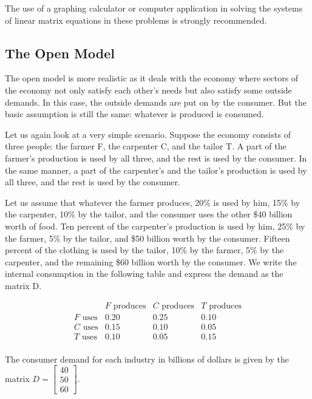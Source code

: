 \begin{note}
    The use of a graphing calculator or computer application in solving the systems of linear matrix equations in these problems is strongly recommended.
\end{note}

\subsection{The Open Model}
The open model is more realistic as it deals with the economy where sectors of the economy not only satisfy each other’s needs but also satisfy some outside demands. In this case, the outside demands are put on by the consumer. But the basic assumption is still the same: whatever is produced is consumed.

Let us again look at a very simple scenario. Suppose the economy consists of three people: the farmer F, the carpenter C, and the tailor T. A part of the farmer's production is used by all three, and the rest is used by the consumer. In the same manner, a part of the carpenter's and the tailor's production is used by all three, and the rest is used by the consumer.

Let us assume that whatever the farmer produces, 20\% is used by him, 15\% by the carpenter, 10\% by the tailor, and the consumer uses the other \$40 billion worth of food. Ten percent of the carpenter's production is used by him, 25\% by the farmer, 5\% by the tailor, and \$50 billion worth by the consumer. Fifteen percent of the clothing is used by the tailor, 10\% by the farmer, 5\% by the carpenter, and the remaining \$60 billion worth by the consumer. We write the internal consumption in the following table and express the demand as the matrix D.

\[
    \begin{array}{cccc}
                       & F \text{ produces} & C \text{ produces} & T \text{ produces} \\
        F \text{ uses} & 0.20               & 0.25               & 0.10               \\
        C \text{ uses} & 0.15               & 0.10               & 0.05               \\
        T \text{ uses} & 0.10               & 0.05               & 0.15               \\
    \end{array}
\]

The consumer demand for each industry in billions of dollars is given by the matrix \( D = \begin{bmatrix} 40 \\ 50 \\ 60 \end{bmatrix} \).



